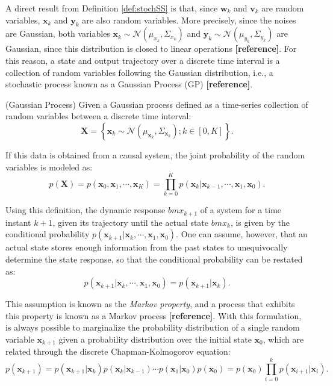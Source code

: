 \documentclass[a4paper,11pt]{book}
\numberwithin{figure}{chapter}
\numberwithin{equation}{chapter}
\numberwithin{table}{chapter}
\theoremstyle{definition}
\newtheorem{definition}{Definition}[chapter]
\newcounter{boxed-theorem}
\newcounter{boxed-definition}
\newenvironment{boxed-definition}[1]
{\colorlet{shadecolor}{pastelYellow!15} \begin{shaded} \begin{definition}{#1}}
{\end{definition} \end{shaded}}
\newcounter{boxed-example}
\begin{document}
A direct result from Definition \ref{def:stochSS} is that, since $\bm{w}_k$ and $\bm{v}_k$ are random variables, $\bm{x}_k$ and $\bm{y}_k$ are also random variables. More precisely, since the noises are Gaussian, both variables $\bm{x}_k \sim \mathcal{N}(\mu_{x_k}, \Sigma_{x_k})$ and $\bm{y}_k \sim \mathcal{N}(\mu_{y_k}, \Sigma_{y_k})$ are Gaussian, since this distribution is closed to linear operations \textbf{[reference]}. For this reason, a state and output trajectory over a discrete time interval is a collection of random variables following the Gaussian distribution, i.e., a stochastic process known as a Gaussian Process (GP) \textbf{[reference]}.

\begin{boxed-definition}{(Gaussian Process)} \label{def:gaussianProcess}
    Given a Gaussian process defined as a time-series collection of random variables between a discrete time interval:
    \begin{equation}
        \bm{X} = \left\{ \bm{x}_k \sim \mathcal{N}(\mu_{\bm{x}_k}, \Sigma_{\bm{x}_k}) ; k \in [0, K] \right\}
    .\end{equation}
    
    If this data is obtained from a causal system, the joint probability of the random variables is modeled as:
    \begin{equation}
        p(\bm{X}) = p(\bm{x}_0, \bm{x}_1, \cdots, \bm{x}_K) = \prod_{k=0}^K p(\bm{x}_k | \bm{x}_{k-1}, \cdots, \bm{x}_1, \bm{x}_0)
    .\end{equation}
\end{boxed-definition}

Using this definition, the dynamic response $bm{x}_{k+1}$ of a system for a time instant $k+1$, given its trajectory until the actual state $bm{x}_{k}$, is given by the conditional probability $p(\bm{x}_{k+1} | \bm{x}_{k}, \cdots, \bm{x}_1, \bm{x}_0)$. One can assume, however, that an actual state stores enough information from the past states to unequivocally determine the state response, so that the conditional probability can be restated as:
\begin{equation}
    p(\bm{x}_{k+1} | \bm{x}_{k}, \cdots, \bm{x}_1, \bm{x}_0) =  p(\bm{x}_{k+1} | \bm{x}_{k})
.\end{equation}

This assumption is known as the \textit{Markov property}, and a process that exhibits this property is known as a Markov process \textbf{[reference]}. With this formulation, is always possible to marginalize the probability distribution of a single random variable $\bm{x}_{k+1}$ given a probability distribution over the initial state $\bm{x}_0$, which are related through the discrete Chapman-Kolmogorov equation:
\begin{equation}
    p(\bm{x}_{k+1}) =  p(\bm{x}_{k+1} | \bm{x}_{k}) p(\bm{x}_{k} | \bm{x}_{k-1}) \cdots p(\bm{x}_{1} | \bm{x}_{0})p(\bm{x}_0) = p(\bm{x}_0) \prod_{i=0}^k p(\bm{x}_{i+1} | \bm{x}_{i})
.\end{equation}
\end{document}
